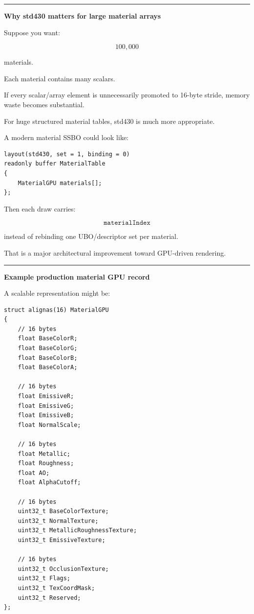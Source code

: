 \begin{center}\rule{0.5\linewidth}{0.5pt}\end{center}

\textbf{Why std430 matters for large material arrays}

Suppose you want:

\[
100,000
\]

materials.

Each material contains many scalars.

If every scalar/array element is unnecessarily promoted to 16-byte stride, memory waste becomes substantial.

For huge structured material tables, std430 is much more appropriate.

A modern material SSBO could look like:

\begin{verbatim}
layout(std430, set = 1, binding = 0)
readonly buffer MaterialTable
{
    MaterialGPU materials[];
};
\end{verbatim}

Then each draw carries:

\[
\texttt{materialIndex}
\]

instead of rebinding one UBO/descriptor set per material.

That is a major architectural improvement toward GPU-driven rendering.

\begin{center}\rule{0.5\linewidth}{0.5pt}\end{center}

\textbf{Example production material GPU record}

A scalable representation might be:

\begin{verbatim}
struct alignas(16) MaterialGPU
{
    // 16 bytes
    float BaseColorR;
    float BaseColorG;
    float BaseColorB;
    float BaseColorA;

    // 16 bytes
    float EmissiveR;
    float EmissiveG;
    float EmissiveB;
    float NormalScale;

    // 16 bytes
    float Metallic;
    float Roughness;
    float AO;
    float AlphaCutoff;

    // 16 bytes
    uint32_t BaseColorTexture;
    uint32_t NormalTexture;
    uint32_t MetallicRoughnessTexture;
    uint32_t EmissiveTexture;

    // 16 bytes
    uint32_t OcclusionTexture;
    uint32_t Flags;
    uint32_t TexCoordMask;
    uint32_t Reserved;
};
\end{verbatim}

